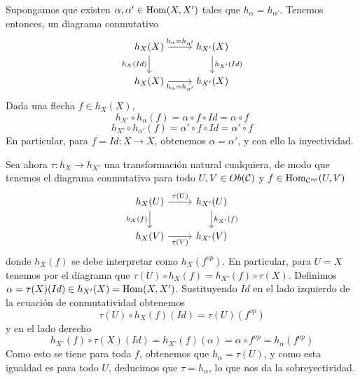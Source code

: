 \documentclass[twoside]{article}
\begin{document}
\begin{solucion}
Supongamos que existen $\alpha,\alpha'\in\operatorname{Hom}(X,X')$ tales que $h_\alpha=h_{\alpha'}$. Tenemos entonces, un diagrama conmutativo
\[
\begin{tikzcd}
h_X(X)\arrow[r, "h_\alpha=h_{\alpha'}"]\arrow[d, "h_X(Id)"'] & h_{X'}(X)\arrow[d, "h_{X'}(Id)"]\\
h_X(X)\arrow[r, "h_\alpha=h_{\alpha'}"'] & h_{X'}(X)
\end{tikzcd}
\]
Dada una flecha $f\in h_X(X)$, $$h_{X'}\circ h_{\alpha}(f)=\alpha\circ f\circ Id=\alpha\circ f$$
$$h_{X'}\circ h_{\alpha'}(f)=\alpha'\circ f\circ Id=\alpha'\circ f$$
En particular, para $f=Id:X\to X$, obtenemos $\alpha=\alpha'$, y con ello la inyectividad. 

Sea ahora $\tau:h_X\to h_{X'}$ una transformación natural cualquiera, de modo que tenemos el diagrama conmutativo para todo $U,V\in Ob({\mathcal C})$  y $f\in\operatorname{Hom}_{{\mathcal C}^{op}}(U,V)$ 
\[
\begin{tikzcd}
h_X(U)\arrow[r, "\tau(U)"] \arrow[d, "h_X(f)"']& h_{X'}(U)\arrow[d, "h_{X'}(f)"]\\
h_X(V)\arrow[r, "\tau(V)"'] & h_{X'}(V)
\end{tikzcd}
\]
donde $h_X(f)$ se debe interpretar como $h_X(f^{op})$. En particular, para $U=X$ tenemos por el diagrama que $\tau(U)\circ h_X(f)=h_{X'}(f)\circ\tau(X)$. Definimos $\alpha=\tau(X)(Id)\in h_{X'}(X)=\operatorname{Hom}(X,X')$. Sustituyendo $Id$ en el lado izquierdo de la ecuación de conmutatividad obtenemos
\[
\tau(U)\circ h_X(f)(Id)=\tau(U)( f^{op})
\]
y en el lado derecho
\[
h_{X'}(f)\circ\tau(X)(Id)=h_{X'}(f)(\alpha)=\alpha\circ f^{op}=h_\alpha(f^{op})
\]
Como esto se tiene para toda $f$, obtenemos que $h_\alpha=\tau(U)$, y como esta igualdad es para todo $U$, deducimos que $\tau=h_{\alpha}$, lo que nos da la sobreyectividad. 
\end{solucion}
%
%
%
%
\end{document}
